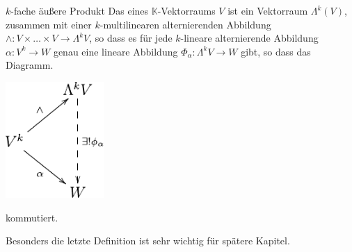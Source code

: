 \begin{Def}{$k$-fache äußere Produkt}
Das  eines $\mathbb{K}$-Vektorraums $V$ ist ein Vektorraum $\Lambda^k(V)$, zusammen mit einer $k$-multilinearen alternierenden Abbildung $\wedge: V\times \dots \times V \rightarrow \Lambda^kV$, so dass es für jede $k$-lineare alternierende Abbildung $\alpha: V^k\rightarrow W$ genau eine lineare Abbildung $\Phi_\alpha:\Lambda^kV\rightarrow W$ gibt, so dass das Diagramm.
\begin{center}
    \includegraphics[width=0.28\textwidth]{Dateien/Tensor4.pdf}
\end{center}
kommutiert.    
\end{Def}
Besonders die letzte Definition ist sehr wichtig für spätere Kapitel.
\newpage
